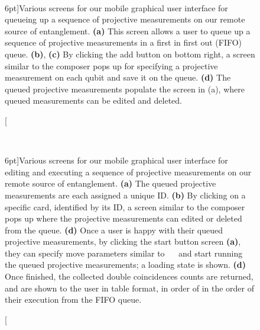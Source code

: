 \begin{figure}
	 \\
	\caption[Various screens for our mobile graphical user interface for queueing up a sequence of projective measurements on our remote source of entanglement.][6pt]{Various screens for our mobile graphical user interface for queueing up a sequence of projective measurements on our remote source of entanglement. \textbf{(a)} This screen allows a user to queue up a sequence of projective measurements in a first in first out (FIFO) queue. \textbf{(b)}, \textbf{(c)} By clicking the add button on bottom right, a screen similar to the composer pops up for specifying a projective measurement on each qubit and save it on the queue. \textbf{(d)} The queued projective measurements populate the screen in (a), where queued measurements can be edited and deleted.} 
\end{figure}


\begin{figure}
	 \\
	\caption[Various screens for our mobile graphical user interface for editing and executing a sequence of projective measurements on our remote source of entanglement.][6pt]{Various screens for our mobile graphical user interface for editing and executing a sequence of projective measurements on our remote source of entanglement. \textbf{(a)} The queued projective measurements are each assigned a unique ID. \textbf{(b)} By clicking on a specific card, identified by its ID, a screen similar to the composer pops up where the projective measurements can edited or deleted from the queue. \textbf{(d)} Once a user is happy with their queued projective measurements, by clicking the start button screen \textbf{(a)}, they can specify move parameters similar to~\protect{} ~\protect{} and start running the queued projective measurements; a loading state is shown. \textbf{(d)} Once finished, the collected double coincidences counts are returned, and are shown to the user in table format, in order of in the order of their execution from the FIFO queue.}
\end{figure}
